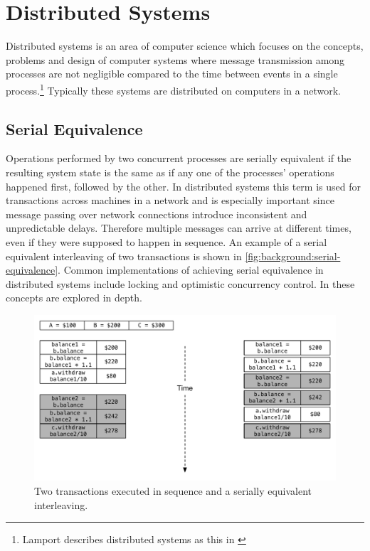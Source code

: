 	\section{Distributed Systems}
		Distributed systems is an area of computer science which focuses on the concepts, problems and design of computer systems where message transmission among processes are not negligible compared to the time between events in a single process.\footnote{Lamport describes distributed systems as this in \cite{Lamport:1978:TCO:359545.359563}} Typically these systems are distributed on computers in a network.
		
		\subsection{Serial Equivalence}
		Operations performed by two concurrent processes are serially equivalent if the resulting system state is the same as if any one of the processes' operations happened first, followed by the other. In distributed systems this term is used for transactions across machines in a network and is especially important since message passing over network connections introduce inconsistent and unpredictable delays. Therefore multiple messages can arrive at different times, even if they were supposed to happen in sequence. An example of a serial equivalent interleaving of two transactions is shown in \autoref{fig:background:serial-equivalence}. Common implementations of achieving serial equivalence in distributed systems include locking and optimistic concurrency control. In \cite{Coulouris:2011:DSC:2029110:chapter16} these concepts are explored in depth.
		
		\begin{figure}[H]
		\centering
		\includegraphics[width=\textwidth]{2background/images/serial-equivalence.pdf}
		\caption{Two transactions executed in sequence and a serially equivalent interleaving.}
		\label{fig:background:serial-equivalence}
		\end{figure}
		
